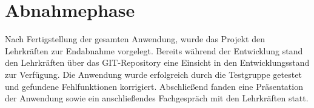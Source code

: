 \section{Abnahmephase} 
\label{sec:Abnahmephase}
Nach Fertigstellung der gesamten Anwendung, wurde das Projekt den Lehrkräften zur Endabnahme vorgelegt. Bereits während der Entwicklung stand den Lehrkräften
über das GIT-Repository eine Einsicht in den Entwicklungsstand zur Verfügung. Die Anwendung wurde erfolgreich durch die Testgruppe getestet und gefundene Fehlfunktionen
korrigiert. Abschließend fanden eine Präsentation der Anwendung sowie ein anschließendes Fachgespräch mit den Lehrkräften statt.